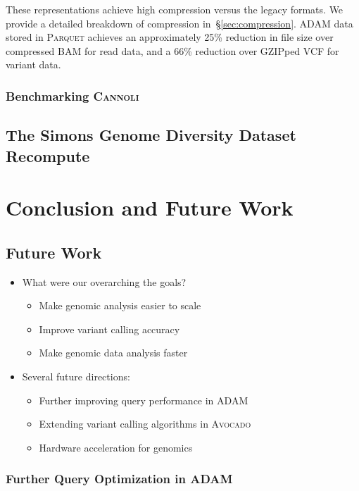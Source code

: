 \documentclass[phd]{ucbthesis}
\begin{document}
These representations achieve high compression versus the legacy formats. We provide a detailed breakdown of
compression in~\S\ref{sec:compression}. \textsc{ADAM} data stored in \textsc{Parquet} achieves an
approximately 25\% reduction in file size over compressed \textsc{BAM} for read data, and a 66\% reduction
over \textsc{GZIP}ped \textsc{VCF} for variant data.

\section{Benchmarking \textsc{Cannoli}}
\label{sec:benchmarking-cannoli}

\chapter{The Simons Genome Diversity Dataset Recompute}
\label{chap:sgdd}

\part{Conclusion and Future Work}

\chapter{Future Work}
\label{chap:future-work}

\begin{itemize}
\item What were our overarching the goals?
  \begin{itemize}
  \item Make genomic analysis easier to scale
  \item Improve variant calling accuracy
  \item Make genomic data analysis faster
  \end{itemize}
\item Several future directions:
  \begin{itemize}
  \item Further improving query performance in \textsc{ADAM}
  \item Extending variant calling algorithms in \textsc{Avocado}
  \item Hardware acceleration for genomics
  \end{itemize}
\end{itemize}

\section{Further Query Optimization in \textsc{ADAM}}
\label{sec:extensions-adam}
\end{document}
